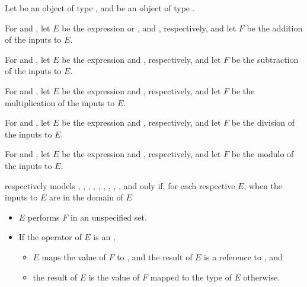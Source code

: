 \begin{itemdescr}
\pnum
Let  be an object of type ,
and  be an object of type .

\pnum
For  and ,
let $E$ be the expression  or , and , respectively, and
let $F$ be the addition of the inputs to $E$.

\pnum
For  and ,
let $E$ be the expression  and , respectively, and
let $F$ be the subtraction of the inputs to $E$.

\pnum
For  and ,
let $E$ be the expression  and , respectively, and
let $F$ be the multiplication of the inputs to $E$.

\pnum
For  and ,
let $E$ be the expression  and , respectively, and
let $F$ be the division of the inputs to $E$.

\pnum
For  and ,
let $E$ be the expression  and , respectively, and
let $F$ be the modulo of the inputs to $E$.

\pnum
{} respectively models
,
,
,
,
,
,
,
,
, and
only if, for each respective $E$, when the inputs to $E$ are in the domain of $E$
\begin{itemize}
\item
$E$ performs $F$ in an unspecified set.
\item
If the operator of $E$ is an ,
\begin{itemize}
\item
$E$ maps the value of $F$ to , and
the result of $E$ is a reference to , and
\item
the result of $E$ is the value of $F$ mapped to the type of $E$ otherwise.
\end{itemize}
\end{itemize}
\end{itemdescr}

